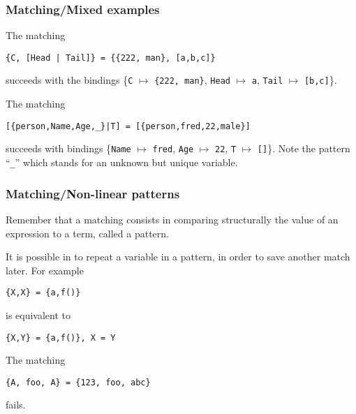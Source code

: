 %
\begin{frame}[containsverbatim]
\frametitle{Matching/Mixed examples}

The matching
\begin{verbatim}
{C, [Head | Tail]} = {{222, man}, [a,b,c]}
\end{verbatim}
succeeds with the bindings \{\texttt{C} \(\mapsto\) \texttt{\{222,
  man\}}, \texttt{Head} \(\mapsto\) \texttt{a}, \texttt{Tail}
\(\mapsto\) \texttt{[b,c]}\}.

The matching
\begin{verbatim}
[{person,Name,Age,_}|T] = [{person,fred,22,male}]
\end{verbatim}
succeeds with bindings \{\texttt{Name} \(\mapsto\) \texttt{fred},
\texttt{Age} \(\mapsto\) \texttt{22}, \texttt{T} \(\mapsto\)
\texttt{[]}\}. Note the pattern ``\texttt{\huge \_}'' which stands for
an unknown but unique variable.

\end{frame}

%
\begin{frame}[containsverbatim]
\frametitle{Matching/Non-linear patterns}

Remember that a matching consists in comparing structurally the value
of an expression to a term, called a pattern.

\bigskip

It is possible in \Erlang to repeat a variable in a pattern, in order
to save another match later. For example
\begin{verbatim}
{X,X} = {a,f()}
\end{verbatim}
is equivalent to
\begin{verbatim}
{X,Y} = {a,f()}, X = Y
\end{verbatim}
The matching
\begin{verbatim}
{A, foo, A} = {123, foo, abc}
\end{verbatim}
fails.

\end{frame}
 
